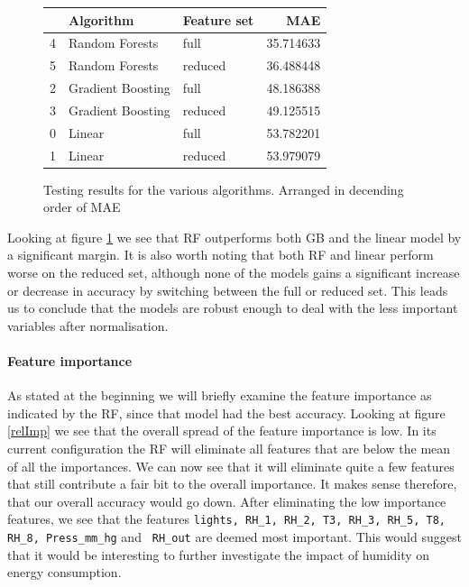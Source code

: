 \documentclass[british]{article}
\newcommand{\code}[1]{\texttt{#1}}
\begin{document}
	\begin{figure}[!ht]
		\begin{tabular}{|l|l|l|r|}
			\toprule
			{} &          Algorithm & Feature set &        MAE \\
			\midrule
			4 &     Random Forests &        full &  35.714633 \\
			5 &     Random Forests &     reduced &  36.488448 \\
			2 &  Gradient Boosting &        full &  48.186388 \\
			3 &  Gradient Boosting &     reduced &  49.125515 \\
			0 &             Linear &        full &  53.782201 \\
			1 &             Linear &     reduced &  53.979079 \\
			\bottomrule
		\end{tabular}
		\caption{Testing results for the various algorithms. Arranged in decending order of MAE}
		\label{resultsTable}
		
	\end{figure}
	Looking at figure \ref{resultsTable} we see that RF outperforms both GB and the linear model by a significant margin. It is also worth noting that both RF and linear perform worse on the reduced set, although none of the models gains a significant increase or decrease in accuracy by switching between the full or reduced set. This leads us to conclude that the models are robust enough to deal with the less important variables after normalisation. 
	
	\paragraph{Feature importance} As stated at the beginning we will briefly examine the feature importance as indicated by the RF, since that model had the best accuracy. Looking at figure \ref{relImp} we see that the overall spread of the feature importance is low. In its current configuration the RF will eliminate all features that are below the mean of all the importances. We can now see that it will eliminate quite a few features that still contribute a fair bit to the overall importance. It makes sense therefore, that our overall accuracy would go down. After eliminating the low importance features, we see that the features \code{lights, RH\_1, RH\_2, T3, RH\_3, RH\_5, T8, RH\_8, Press\_mm\_hg} and \code{ RH\_out} are deemed most important. This would suggest that it would be interesting to further investigate the impact of humidity on energy consumption. 
	
\end{document}

